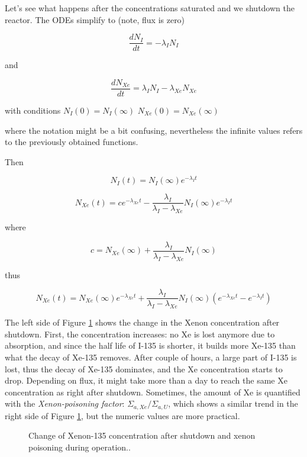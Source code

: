 Let's see what happens after the concentrations saturated and we shutdown the reactor. The ODEs simplify to (note, flux is zero)

$$ \frac{dN_I}{dt}=-\lambda_IN_I $$

\noindent and

$$ \frac{dN_{Xe}}{dt}= \lambda_IN_I -\lambda_{Xe}N_{Xe} $$

\noindent with conditions $N_I(0)=N_I(\infty)$ $N_{Xe}(0)=N_{Xe}(\infty)$

\noindent where the notation might be a bit confusing, nevertheless the infinite values refers to the previously obtained functions.

Then

$$ N_I(t)=N_I(\infty)e^{-\lambda_It} $$

$$ N_{Xe}(t) = c e^{-\lambda_{Xe}t} - \frac{\lambda_I}{\lambda_I - \lambda_{Xe}}N_I(\infty)e^{-\lambda_{I}t} $$

\noindent where

$$ c = N_{Xe}(\infty)+\frac{\lambda_I}{\lambda_I - \lambda_{Xe}}N_I(\infty) $$

\noindent thus


$$ N_{Xe} (t) = N_{Xe}(\infty)e^{-\lambda_{Xe}t}+\frac{\lambda_I}{\lambda_I - \lambda_{Xe}}N_I(\infty)(e^{-\lambda_{Xe}t} - e^{-\lambda_{I}t}) $$

The left side of Figure \ref{fig:xenonpois} shows the change in the Xenon concentration after shutdown. First, the concentration increases: no Xe is lost anymore due to absorption, and since the half life of I-135 is shorter, it builds more Xe-135 than what the decay of Xe-135 removes. After couple of hours, a large part of I-135 is lost, thus the decay of Xe-135 dominates, and the Xe concentration starts to drop. Depending on flux, it might take more than a day to reach the same Xe concentration as right after shutdown. Sometimes, the amount of Xe is quantified with the \textit{Xenon-poisoning factor}: $\Sigma_{a,Xe}/\Sigma_{a,U}$, which shows a similar trend in the right side of Figure \ref{fig:xenonpois}, but the numeric values are more practical.

\begin{figure}[ht!]
\protect {}\protect
\caption{\label{fig:xenonpois} \footnotesize{Change of Xenon-135 concentration after shutdown and xenon poisoning during operation..}}
\end{figure}

